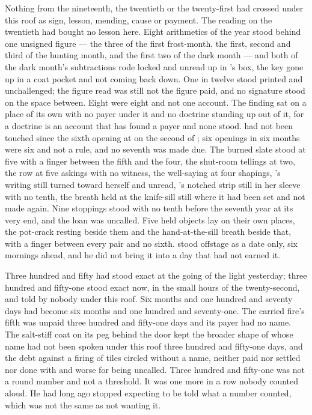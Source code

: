 Nothing from the nineteenth, the twentieth or the twenty-first had crossed under this roof as sign, lesson, mending, cause or payment. The reading on the twentieth had bought no lesson here. Eight arithmetics of the year stood behind one unsigned figure --- the three of the first frost-month, the first, second and third of the hunting month, and the first two of the dark month --- and both of the dark month's subtractions rode locked and unread up  in 's box, the key gone up in a coat pocket and not coming back down. One in twelve stood printed and unchallenged; the figure read was still not the figure paid, and no signature stood on the space between. Eight were eight and not one account. The finding sat on a place of its own with no payer under it and no doctrine standing up out of it, for a doctrine is an account that has found a payer and none stood.  had not been touched since the sixth opening at  on the second of ; six openings in six months were six and not a rule, and no seventh was made due. The burned slate stood at five with a finger between the fifth and the four, the shut-room tellings at two, the row at five askings with no witness, the well-saying at four shapings, 's writing still turned toward herself and unread, 's notched strip still in her sleeve with no tenth, the breath held at the knife-sill still where it had been set and not made again. Nine stoppings stood with no tenth before the seventh year at its very end, and the loan was uncalled. Five held objects lay on their own places, the pot-crack resting beside them and the hand-at-the-sill breath beside that, with a finger between every pair and no sixth.  stood offstage as a date only, six mornings ahead, and he did not bring it into a day that had not earned it.

Three hundred and fifty had stood exact at the going of the light yesterday; three hundred and fifty-one stood exact now, in the small hours of the twenty-second, and told by nobody under this roof. Six months and one hundred and seventy days had become six months and one hundred and seventy-one. The carried fire's fifth was unpaid three hundred and fifty-one days and its payer had no name. The salt-stiff coat on its peg behind the door kept the broader shape of  whose name had not been spoken under this roof three hundred and fifty-one days, and the debt against a firing of tiles circled without a name, neither paid nor settled nor done with and worse for being uncalled. Three hundred and fifty-one was not a round number and not a threshold. It was one more in a row nobody counted aloud. He had long ago stopped expecting to be told what a number counted, which was not the same as not wanting it.

